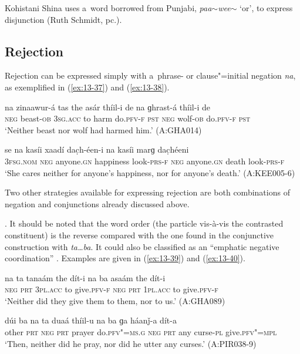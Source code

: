 Kohistani Shina uses a~word borrowed from Punjabi, \textit{paa$\sim$wee$\sim$} `or', to express disjunction (Ruth Schmidt, pc.).


\subsection{Rejection}
\label{subsec:13-2-4}

 Rejection can be expressed simply with a~phrase- or clause"=initial negation \textit{na}, as exemplified in (\ref{ex:13-37}) and (\ref{ex:13-38}).

\begin{exe}
\ex
\label{ex:13-37}
\gll na zinaawur-á tas the asár thíil-i de na ɡhrast-á thíil-i de \\
\textsc{neg} beast-\textsc{ob} \textsc{3sg.acc} to harm do.\textsc{pfv-f} \textsc{pst}  \textsc{neg} wolf-\textsc{ob} do.\textsc{pfv-f} \textsc{pst} \\
\glt `Neither beast nor wolf had harmed him.' (A:GHA014)

\ex
\label{ex:13-38}
\gll se na kasíi xaadí dac̣h-éen-i na kasíi marɡ dac̣héeni \\
\textsc{3fsg.nom} \textsc{neg} anyone.\textsc{gn} happiness look-\textsc{prs-f}  \textsc{neg} anyone.\textsc{gn} death look-\textsc{prs-f}  \\
\glt `She cares neither for anyone's happiness, nor for anyone's death.' (A:KEE005-6) 
\end{exe}

Two other strategies available for expressing rejection are both combinations of negation and conjunctions already discussed above.


. It should be noted that the word order (the particle vis-à-vis the contrasted constituent) is the reverse compared with the one found in the conjunctive construction with \textit{ta{\ldots}ba}. It could also be classified as an ``emphatic negative coordination'' \citep[17--19]{haspelmath2007}. Examples are given in (\ref{ex:13-39}) and (\ref{ex:13-40}).

\begin{exe}
\ex
\label{ex:13-39}
\gll na ta tanaám the dít-i na ba asaám the dít-i \\
\textsc{neg} \textsc{prt} \textsc{3pl.acc} to give.\textsc{pfv-f} \textsc{neg} \textsc{prt} \textsc{1pl.acc} to give.\textsc{pfv-f}  \\
\glt `Neither did they give them to them, nor to us.' (A:GHA089)

\ex
\label{ex:13-40}
\gll dúi ba na ta duaá thíil-u na ba ɡa háanǰ-a dít-a \\
other \textsc{prt} \textsc{neg} \textsc{prt} prayer do.\textsc{pfv"=ms.g} \textsc{neg} \textsc{prt} any curse-\textsc{pl} give.\textsc{pfv"=mpl}\\
\glt `Then, neither did he pray, nor did he utter any curses.' (A:PIR038-9) 
\end{exe}

